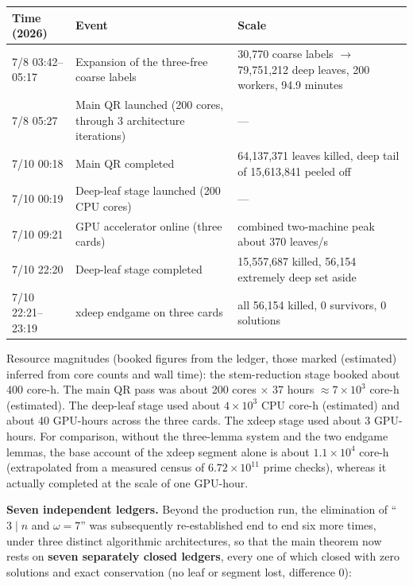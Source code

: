 \documentclass[11pt]{article}
\theoremstyle{remark}
\begin{document}
\begin{center}\footnotesize
\begin{tabular}{p{2.6cm}p{6.4cm}p{4.6cm}}
\toprule Time (2026) & Event & Scale \\
\midrule 7/8 03:42--05:17 & Expansion of the three-free coarse labels & 30,770 coarse labels $\to$ 79,751,212 deep leaves, 200 workers, 94.9 minutes \\
7/8 05:27 & Main QR launched (200 cores, through 3 architecture iterations) & --- \\
7/10 00:18 & Main QR completed & 64,137,371 leaves killed, deep tail of 15,613,841 peeled off \\
7/10 00:19 & Deep-leaf stage launched (200 CPU cores) & --- \\
7/10 09:21 & GPU accelerator online (three cards) & combined two-machine peak about 370 leaves/s \\
7/10 22:20 & Deep-leaf stage completed & 15,557,687 killed, 56,154 extremely deep set aside \\
7/10 22:21--23:19 & xdeep endgame on three cards & all 56,154 killed, 0 survivors, 0 solutions \\
\bottomrule
\end{tabular}
\end{center}

Resource magnitudes (booked figures from the ledger, those marked (estimated) inferred from core counts and wall time): the stem-reduction stage booked about 400 core-h. The main QR pass was about 200 cores $\times$ 37 hours $\approx 7 \times 10^3$ core-h (estimated). The deep-leaf stage used about $4 \times 10^3$ CPU core-h (estimated) and about 40 GPU-hours across the three cards. The xdeep stage used about 3 GPU-hours. For comparison, without the three-lemma system and the two endgame lemmas, the base account of the xdeep segment alone is about $1.1 \times 10^4$ core-h (extrapolated from a measured census of $6.72 \times 10^{11}$ prime checks), whereas it actually completed at the scale of one GPU-hour.

\textbf{Seven independent ledgers.} Beyond the production run, the elimination of ``$3 \mid n$ and $\omega = 7$'' was subsequently re-established end to end six more times, under three distinct algorithmic architectures, so that the main theorem now rests on \textbf{seven separately closed ledgers}, every one of which closed with zero solutions and exact conservation (no leaf or segment lost, difference 0):
\end{document}
